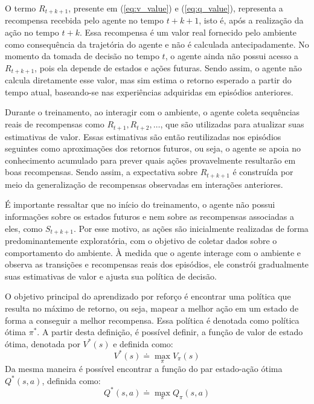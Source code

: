 O termo \(R_{t+k+1}\), presente em (\ref{eq:v_value}) e (\ref{eq:q_value}),
representa a recompensa recebida pelo agente no tempo \(t+k+1\), isto é,
após a realização da ação no tempo \(t+k\). Essa recompensa é um valor real fornecido pelo 
ambiente como consequência da trajetória do agente e não é calculada antecipadamente. No momento da tomada de decisão 
no tempo \(t\), o agente ainda não possui acesso a \(R_{t+k+1}\), pois ela depende de estados e ações futuras. 
Sendo assim, o agente não calcula diretamente esse valor, mas sim estima o retorno esperado a partir do tempo atual, 
baseando-se nas experiências adquiridas em episódios anteriores.

Durante o treinamento, ao interagir com o ambiente, o agente coleta sequências reais de recompensas como
\(R_{t+1}, R_{t+2}, \ldots \), que são utilizadas para atualizar suas estimativas de valor. Essas estimativas 
são então reutilizadas nos episódios seguintes como aproximações dos retornos futuros, ou seja, o agente se apoia 
no conhecimento acumulado para prever quais ações provavelmente resultarão em boas recompensas. Sendo assim,
a expectativa sobre \(R_{t+k+1}\) é construída por meio da generalização de recompensas observadas em interações anteriores.

É importante ressaltar que no início do treinamento, o agente não possui informações sobre os estados futuros 
e nem sobre as recompensas associadas a eles, como \(S_{t+k+1}\).
Por esse motivo, as ações são inicialmente realizadas de forma predominantemente exploratória, 
com o objetivo de coletar dados sobre o comportamento do ambiente. 
À medida que o agente interage com o ambiente e observa as transições e recompensas reais dos episódios, 
ele constrói gradualmente suas estimativas de valor e ajusta sua política de decisão.


O objetivo principal do aprendizado por reforço é encontrar uma política que 
resulta no máximo de retorno, ou seja, mapear a melhor ação em um estado de forma
a conseguir a melhor recompensa. Essa política é denotada como política ótima 
\(\pi^*\). A partir desta definição, é possível definir, a função de valor
de estado ótima, denotada por \(V^*(s)\) e definida como:
\begin{equation}
    V^*(s) \doteq \max_{\pi} V_{\pi}(s)
\end{equation}
Da mesma maneira é possível encontrar a função do par estado-ação ótima \(Q^*(s,a)\),
definida como:
\begin{equation}
    Q^*(s,a) \doteq \max_{\pi} Q_{\pi}(s, a)
\end{equation}

